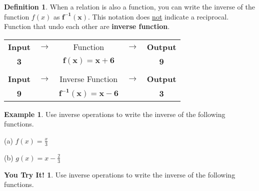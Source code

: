 \documentclass{report}
\theoremstyle{definition}
\newtheorem{example}{\bf Example}
\newtheorem{youtry}{\bf You Try It!}
\newtheorem{definition}{\bf Definition}[section]
\begin{document}
\normalsize
\vfill

 \newpage


\begin{definition}
When a relation is also a function, you can write the inverse of the function $f(x)$ as $\mathbf{f^{-1}(x)}$. This notation does \underline{not} indicate a reciprocal. Function that undo each other are \textbf{inverse function}.
\end{definition}

\large
\begin{center}
	\begin{tabular}[t]{ccccc}
		\color{blue}\textbf{Input}\color{black}  & $\longrightarrow$ & Function & $\longrightarrow$ & \color{red}\textbf{Output}\color{black} \\
		\color{blue}\textbf{3}\color{black}        & & $\mathbf{f(x)=x+6}$ & & \color{red}\textbf{9}\color{black}\\
		&&&&\\
		\color{red}\textbf{Input}\color{black}  & $\longrightarrow$ & Inverse Function & $\longrightarrow$ & \color{blue}\textbf{Output}\color{black} \\
		\color{red}\textbf{9}\color{black} & & $\mathbf{f^{-1}(x) = x - 6}$ & & \color{blue}\textbf{3}\color{black}\\
	\end{tabular}

\end{center}
\normalsize

%

\begin{example}
Use inverse operations to write the inverse of the following functions.
\end{example}

\begin{minipage}[t]{0.45\linewidth}
(a) $f(x)=\displaystyle\frac{x}{3}$
\end{minipage}
\hfill
\begin{minipage}[t]{0.45\linewidth}
(b) $g(x)=x-\displaystyle\frac{2}{3}$
\end{minipage}
\vfill

%

\begin{youtry}
Use inverse operations to write the inverse of the following functions.
\end{youtry}
\end{document}
